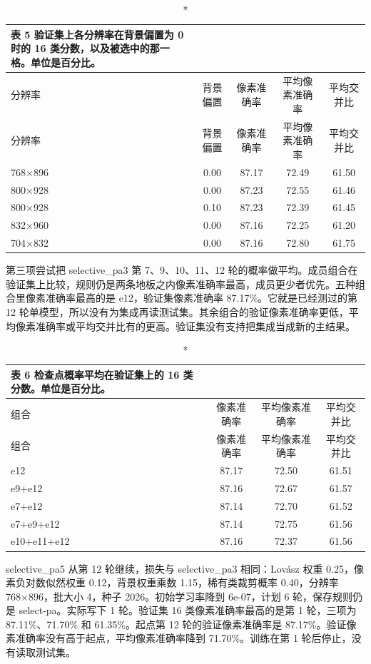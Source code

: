 \documentclass[11pt]{article}
\begin{document}
{\footnotesize\setlength{\tabcolsep}{3pt}
\begin{longtable}{lcccc}
\caption*{表 5  验证集上各分辨率在背景偏置为 0 时的 16 类分数，以及被选中的那一格。单位是百分比。}\\
\toprule
分辨率 & 背景偏置 & 像素准确率 & 平均像素准确率 & 平均交并比\\
\midrule
\endfirsthead
\toprule
分辨率 & 背景偏置 & 像素准确率 & 平均像素准确率 & 平均交并比\\
\midrule
\endhead
768×896 & 0.00 & 87.17 & 72.49 & 61.50\\
800×928 & 0.00 & 87.23 & 72.55 & 61.46\\
800×928 & 0.10 & 87.23 & 72.39 & 61.45\\
832×960 & 0.00 & 87.16 & 72.25 & 61.20\\
704×832 & 0.00 & 87.16 & 72.80 & 61.75\\
\bottomrule
\end{longtable}
}
第三项尝试把 selective\_pa3 第 7、9、10、11、12 轮的概率做平均。成员组合在验证集上比较，规则仍是两条地板之内像素准确率最高，成员更少者优先。五种组合里像素准确率最高的是 e12，验证集像素准确率 87.17\%。它就是已经测过的第 12 轮单模型，所以没有为集成再读测试集。其余组合的验证像素准确率更低，平均像素准确率或平均交并比有的更高。验证集没有支持把集成当成新的主结果。

{\footnotesize\setlength{\tabcolsep}{3pt}
\begin{longtable}{lccc}
\caption*{表 6  检查点概率平均在验证集上的 16 类分数。单位是百分比。}\\
\toprule
组合 & 像素准确率 & 平均像素准确率 & 平均交并比\\
\midrule
\endfirsthead
\toprule
组合 & 像素准确率 & 平均像素准确率 & 平均交并比\\
\midrule
\endhead
e12 & 87.17 & 72.50 & 61.51\\
e9+e12 & 87.16 & 72.67 & 61.57\\
e7+e12 & 87.14 & 72.70 & 61.52\\
e7+e9+e12 & 87.14 & 72.75 & 61.56\\
e10+e11+e12 & 87.16 & 72.37 & 61.56\\
\bottomrule
\end{longtable}
}
selective\_pa5 从第 12 轮继续，损失与 selective\_pa3 相同：Lovász 权重 0.25，像素负对数似然权重 0.12，背景权重乘数 1.15，稀有类裁剪概率 0.40，分辨率 768×896，批大小 4，种子 2026。初始学习率降到 6e-07，计划 6 轮，保存规则仍是 select-pa。实际写下 1 轮。验证集 16 类像素准确率最高的是第 1 轮，三项为 87.11\%、71.70\% 和 61.35\%。起点第 12 轮的验证像素准确率是 87.17\%。验证像素准确率没有高于起点，平均像素准确率降到 71.70\%。训练在第 1 轮后停止，没有读取测试集。
\end{document}
